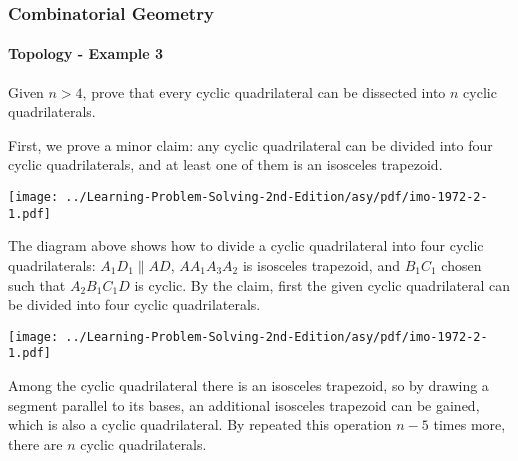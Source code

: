 \documentclass[8pt,xcolor=table,dvipsnames]{beamer}
\begin{document}
\begin{frame}[t]
    \frametitle{Combinatorial Geometry}
    \framesubtitle{Topology - Example 3}
    \begin{example}[IMO 1972/2]
        Given $n>4$, prove that every cyclic quadrilateral can be dissected into $n$ cyclic quadrilaterals.
    \end{example}
    \begin{overprint}
        First, we prove a minor claim:
        any cyclic quadrilateral can be divided into four cyclic quadrilaterals,
        and at least one of them is an isosceles trapezoid.
        \begin{center}
            \texttt{[image: ../Learning-Problem-Solving-2nd-Edition/asy/pdf/imo-1972-2-1.pdf]}
        \end{center}
        The diagram above shows how to divide a cyclic quadrilateral
        into four cyclic quadrilaterals: $A_1D_1 \parallel AD$, $AA_1A_3A_2$ is isosceles trapezoid,
        and $B_1C_1$ chosen such that $A_2B_1C_1D$ is cyclic.
        By the claim, first the given cyclic quadrilateral can be divided into four cyclic quadrilaterals.
        \begin{center}
            \texttt{[image: ../Learning-Problem-Solving-2nd-Edition/asy/pdf/imo-1972-2-1.pdf]}
        \end{center}
        Among the cyclic quadrilateral there is an isosceles trapezoid,
        so by drawing a segment parallel to its bases,
        an additional isosceles trapezoid can be gained, which is also a cyclic quadrilateral.
        By repeated this operation $n-5$ times more, there are $n$ cyclic quadrilaterals.
    \end{overprint}
\end{frame}
\end{document}
